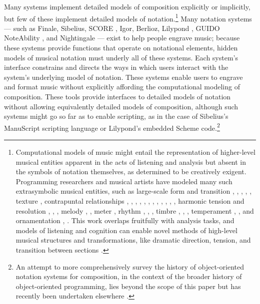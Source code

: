 \documentclass{article}
\begin{document}
Many systems implement detailed models of composition explicitly or implicitly, but
few of these implement detailed models of notation.\footnote{Computational
models of music might entail the representation of higher-level musical
entities apparent in the acts of listening and analysis but absent in the
symbols of notation themselves, as determined to be creatively exigent.
Programming researchers and musical artists have modeled many such
extrasymbolic musical entities, such as large-scale form and transition
\cite{polansky1991morphological}, \cite{uno1994temporal},
\cite{dobrian1995algorithmic}, \cite{abrams1999higher}, \cite{Yoo1983}, texture
\cite{Horenstein:2004kx}, contrapuntal relationships \cite{Boenn:2009oq},
\cite{Acevedo2005}, \cite{Anders:2011kl}, \cite{Balser:1990tg},
\cite{Jones:2000hc}, \cite{uno1994temporal}, \cite{Bell:1995ij},
\cite{farbood2001analysis}, \cite{Cope:2002fv}, \cite{Laurson:2005dz},
\cite{Polansky:2011fu}, \cite{Ebcioglu:1980kl}, harmonic tension and resolution
\cite{Melo2003}, \cite{Wiggins1999}, \cite{Foster:1995qa}, melody
\cite{Hornel:1993mi}, \cite{Smith:1992pi}, meter \cite{Hamanaka:2005ff}, rhythm
\cite{Nauert2007}, \cite{Degazio:1996lh}, \cite{Collins:2003bs}, timbre
\cite{Xenakis:1991fu}, \cite{Creasey:1996ye}, \cite{Osaka2004}, temperament
\cite{Seymour:2007qo}, \cite{Graf:2006il}, and ornamentation
\cite{Ariza:2003zt}, \cite{Chico-Topfer:1998jl}. This work overlaps fruitfully
with analysis tasks, and models of listening and cognition can enable novel
methods of high-level musical structures and transformations, like dramatic
direction, tension, and transition between sections \cite[108]{Collins2009}.} Many notation systems --- such as Finale, Sibelius, SCORE \cite{Smith:1972mw}, Igor, Berlioz, Lilypond \cite{Nienhuys:2003ve}, GUIDO \cite{Hoos:1998bd} NoteAbility \cite{hamel1noteability}, and Nightingale --- exist to help people engrave music; because these systems provide functions that operate on notational elements, hidden models of musical notation must underly all of these systems. Each system's interface constrains and directs the ways in which users interact with the system's underlying model of notation. These systems enable users to engrave and format music without explicitly affording the computational modeling of composition. These tools provide interfaces to detailed models of notation without allowing equivalently detailed models of composition, although such systems might go so far as to enable scripting, as in the case of Sibelius's
ManuScript \cite{Technology:qc} scripting language or Lilypond's embedded Scheme code.\footnote{An attempt to more comprehensively survey the history of object-oriented notation systems for
composition, in the context of the broader history of object-oriented programming,
lies beyond the scope of this paper but has recently been undertaken elsewhere
\cite{Trevino:2013aa}.}
\end{document}
